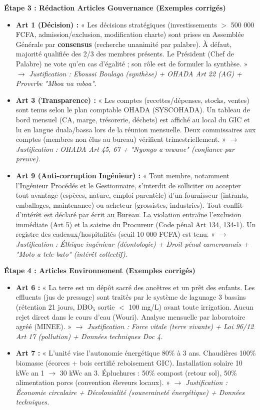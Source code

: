 \documentclass[11pt]{article}
\begin{document}
\begin{exoresolu}
\textbf{Étape 3 : Rédaction Articles Gouvernance (Exemples corrigés)}
\begin{itemize}
    \item \textbf{Art 1 (Décision) :} « Les décisions stratégiques (investissements $>$ 500 000 FCFA, admission/exclusion, modification charte) sont prises en Assemblée Générale par \textbf{consensus} (recherche unanimité par palabre). À défaut, majorité qualifiée des 2/3 des membres présents. Le Président (Chef de Palabre) ne vote qu'en cas d'égalité ; son rôle est de formuler la synthèse. » $\rightarrow$ \textit{Justification : Eboussi Boulaga (synthèse) + OHADA Art 22 (AG) + Proverbe "Mboa na mboa".}
    \item \textbf{Art 3 (Transparence) :} « Les comptes (recettes/dépenses, stocks, ventes) sont tenus selon le plan comptable OHADA (SYSCOHADA). Un tableau de bord mensuel (CA, marge, trésorerie, déchets) est affiché au local du GIC et lu en langue duala/bassa lors de la réunion mensuelle. Deux commissaires aux comptes (membres non élus au bureau) vérifient trimestriellement. » $\rightarrow$ \textit{Justification : OHADA Art 45, 67 + "Nyongo a mwane" (confiance par preuve).}
    \item \textbf{Art 9 (Anti-corruption Ingénieur) :} « Tout membre, notamment l'Ingénieur Procédés et le Gestionnaire, s'interdit de solliciter ou accepter tout avantage (espèces, nature, emploi parentèle) d'un fournisseur (intrants, emballages, maintenance) ou acheteur (grossistes, industries). Tout conflit d'intérêt est déclaré par écrit au Bureau. La violation entraîne l'exclusion immédiate (Art 5) et la saisine du Procureur (Code pénal Art 134, 134-1). Un registre des cadeaux/hospitalités (seuil 10 000 FCFA) est tenu. » $\rightarrow$ \textit{Justification : Éthique ingénieur (déontologie) + Droit pénal camerounais + "Moto a tele bato" (intérêt collectif).}
\end{itemize}

\textbf{Étape 4 : Articles Environnement (Exemples corrigés)}
\begin{itemize}
    \item \textbf{Art 6 :} « La terre est un dépôt sacré des ancêtres et un prêt des enfants. Les effluents (jus de pressage) sont traités par le système de lagunage 3 bassins (rétention 21 jours, DBO$_5$ sortie $<$ 100 mg/L) avant toute irrigation. Aucun rejet direct dans le cours d'eau (Wouri). Analyse mensuelle par laboratoire agréé (MINEE). » $\rightarrow$ \textit{Justification : Force vitale (terre vivante) + Loi 96/12 Art 17 (pollution) + Données techniques Doc 4.}
    \item \textbf{Art 7 :} « L'unité vise l'autonomie énergétique 80\% à 3 ans. Chaudières 100\% biomasse (écorces + bois certifié reboisement GIC). Installation solaire 10 kWc an 1 $\rightarrow$ 30 kWc an 3. Épluchures : 50\% compost (retour sol), 50\% alimentation porcs (convention éleveurs locaux). » $\rightarrow$ \textit{Justification : Économie circulaire + Décolonialité (souveraineté énergétique) + Données techniques.}
\end{itemize}


\end{exoresolu}
\end{document}
